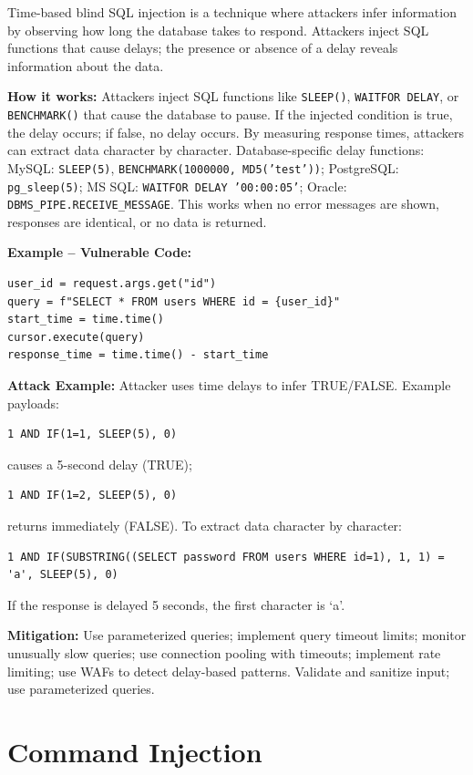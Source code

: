 Time-based blind SQL injection is a technique where attackers infer information by observing how long the database takes to respond. Attackers inject SQL functions that cause delays; the presence or absence of a delay reveals information about the data.

\textbf{How it works:} Attackers inject SQL functions like \texttt{SLEEP()}, \texttt{WAITFOR DELAY}, or \texttt{BENCHMARK()} that cause the database to pause. If the injected condition is true, the delay occurs; if false, no delay occurs. By measuring response times, attackers can extract data character by character. Database-specific delay functions: MySQL: \texttt{SLEEP(5)}, \texttt{BENCHMARK(1000000, MD5('test'))}; PostgreSQL: \texttt{pg\_sleep(5)}; MS SQL: \texttt{WAITFOR DELAY '00:00:05'}; Oracle: \texttt{DBMS\_PIPE.RECEIVE\_MESSAGE}. This works when no error messages are shown, responses are identical, or no data is returned.

\textbf{Example -- Vulnerable Code:}

\begin{lstlisting}[style=pycode]
user_id = request.args.get("id")
query = f"SELECT * FROM users WHERE id = {user_id}"
start_time = time.time()
cursor.execute(query)
response_time = time.time() - start_time
\end{lstlisting}

\textbf{Attack Example:} Attacker uses time delays to infer TRUE/FALSE. Example payloads:
\begin{lstlisting}[style=attackcode]
1 AND IF(1=1, SLEEP(5), 0)
\end{lstlisting}
causes a 5-second delay (TRUE);
\begin{lstlisting}[style=attackcode]
1 AND IF(1=2, SLEEP(5), 0)
\end{lstlisting}
returns immediately (FALSE). To extract data character by character:
\begin{lstlisting}[style=attackcode]
1 AND IF(SUBSTRING((SELECT password FROM users WHERE id=1), 1, 1) = 'a', SLEEP(5), 0)
\end{lstlisting}
If the response is delayed 5 seconds, the first character is `a'.

\textbf{Mitigation:} Use parameterized queries; implement query timeout limits; monitor unusually slow queries; use connection pooling with timeouts; implement rate limiting; use WAFs to detect delay-based patterns. Validate and sanitize input; use parameterized queries.

\section{Command Injection}
\label{sec:background_cmd_injection}

